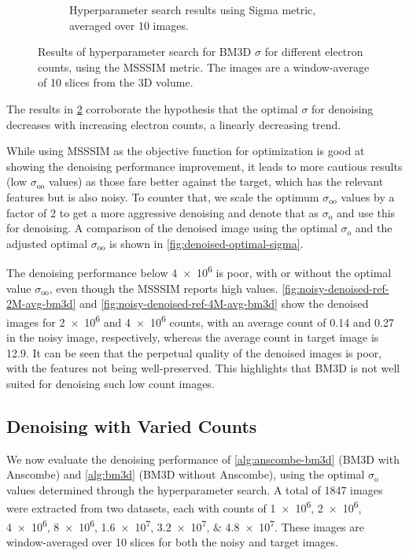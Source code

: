 \begin{figure}
\begin{subfigure}[t]{0.49\linewidth}
        \caption{Hyperparameter search results using Sigma metric, averaged over 10 images.}
        \label{fig:hyperparameter-sigma-averaged-10-images}
    \end{subfigure}
    \caption{Results of hyperparameter search for \gls{BM3D} $\sigma$ for different electron counts, using the \gls{MSSSIM} metric. The images are a window-average of \num{10} slices from the 3D volume.}
    \label{fig:hyperparameter-averaged-10-images}
\end{figure}

The results in \cref{fig:hyperparameter-averaged-10-images} corroborate the hypothesis that the optimal $\sigma$ for denoising decreases with increasing electron counts, a linearly decreasing trend.

While using \gls{MSSSIM} as the objective function for optimization is good at showing the denoising performance improvement, it leads to more cautious results (low $\sigma_{\text{oo}}$ values) as those fare better against the target, which has the relevant features but is also noisy. To counter that, we scale the optimum $\sigma_{\text{oo}}$ values by a factor of 2 to get a more aggressive denoising and denote that as $\sigma_{\text{o}}$ and use this for denoising. A comparison of the denoised image using the optimal $\sigma_{\text{o}}$ and the adjusted optimal $\sigma_{\text{oo}}$ is shown in \cref{fig:denoised-optimal-sigma}.

The denoising performance below \num{4e6} is poor, with or without the optimal value $\sigma_{\text{oo}}$, even though the \gls{MSSSIM} reports high values. \cref{fig:noisy-denoised-ref-2M-avg-bm3d} and \cref{fig:noisy-denoised-ref-4M-avg-bm3d} show the denoised images for \num{2e6} and \num{4e6} counts, with an average count of \num{0.14} and \num{0.27} in the noisy image, respectively, whereas the average count in target image is \num{12.9}. It can be seen that the perpetual quality of the denoised images is poor, with the features not being well-preserved. This highlights that \gls{BM3D} is not well suited for denoising such low count images.

\subsection{Denoising with Varied Counts}
We now evaluate the denoising performance of \cref{alg:anscombe-bm3d} (\gls{BM3D} with Anscombe) and \cref{alg:bm3d} (\gls{BM3D} without Anscombe), using the optimal $\sigma_{\text{o}}$ values determined through the hyperparameter search. A total of \num{1847} images were extracted from two datasets, each with counts of \numlist{1e6;2e6;4e6;8e6;1.6e7;3.2e7;4.8e7}. These images are window-averaged over 10 slices for both the noisy and target images. 

